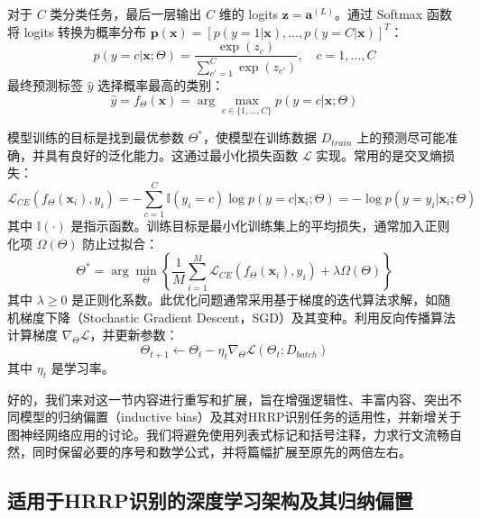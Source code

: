 对于 $C$ 类分类任务，最后一层输出 $C$ 维的 logits $\mathbf{z} = \mathbf{a}^{(L)}$。通过 Softmax 函数将 logits 转换为概率分布 $\mathbf{p}(\mathbf{x}) = [p(y=1|\mathbf{x}), \dots, p(y=C|\mathbf{x})]^T$：
\begin{equation}
    p(y=c|\mathbf{x}; \Theta) = \frac{\exp(z_c)}{\sum_{c'=1}^{C} \exp(z_{c'})}, \quad c=1, \dots, C
    \label{eq:softmax}
\end{equation}
最终预测标签 $\hat{y}$ 选择概率最高的类别：
\begin{equation}
    \hat{y} = f_\Theta(\mathbf{x}) = \arg\max_{c \in \{1, \dots, C\}} p(y=c|\mathbf{x}; \Theta)
    \label{eq:prediction}
\end{equation}

模型训练的目标是找到最优参数 $\Theta^*$，使模型在训练数据 $D_{train}$ 上的预测尽可能准确，并具有良好的泛化能力。这通过最小化损失函数 $\mathcal{L}$ 实现。常用的是交叉熵损失：
\begin{equation}
    \mathcal{L}_{CE}(f_\Theta(\mathbf{x}_i), y_i) = -\sum_{c=1}^{C} \mathbb{I}(y_i=c) \log p(y=c|\mathbf{x}_i; \Theta) = -\log p(y=y_i|\mathbf{x}_i; \Theta)
    \label{eq:cross_entropy_loss}
\end{equation}
其中 $\mathbb{I}(\cdot)$ 是指示函数。训练目标是最小化训练集上的平均损失，通常加入正则化项 $\Omega(\Theta)$ 防止过拟合：
\begin{equation}
    \Theta^* = \arg\min_{\Theta} \left\{ \frac{1}{M} \sum_{i=1}^{M} \mathcal{L}_{CE}(f_\Theta(\mathbf{x}_i), y_i) + \lambda \Omega(\Theta) \right\}
    \label{eq:optimization_objective}
\end{equation}
其中 $\lambda \ge 0$ 是正则化系数。此优化问题通常采用基于梯度的迭代算法求解，如随机梯度下降（Stochastic Gradient Descent，SGD）及其变种。利用反向传播算法计算梯度 $\nabla_\Theta \mathcal{L}$，并更新参数：
\begin{equation}
    \Theta_{t+1} \leftarrow \Theta_t - \eta_t \nabla_\Theta \mathcal{L}(\Theta_t; D_{batch})
    \label{eq:sgd_update}
\end{equation}
其中 $\eta_t$ 是学习率。

好的，我们来对这一节内容进行重写和扩展，旨在增强逻辑性、丰富内容、突出不同模型的归纳偏置（inductive bias）及其对HRRP识别任务的适用性，并新增关于图神经网络应用的讨论。我们将避免使用列表式标记和括号注释，力求行文流畅自然，同时保留必要的序号和数学公式，并将篇幅扩展至原先的两倍左右。

\subsection{适用于HRRP识别的深度学习架构及其归纳偏置}
\label{subsec:typical_深度学习_models_revised}

